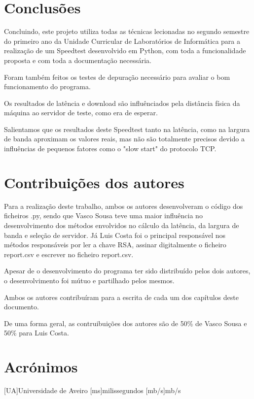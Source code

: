 \documentclass{report}
\begin{document}
\chapter{Conclusões}
\label{chap.conclusao}
\par Concluindo, este projeto utiliza todas as técnicas lecionadas no segundo semestre do primeiro ano da Unidade Curricular de Laboratórios de Informática para a realização de um Speedtest desenvolvido em Python\cite{python}, com toda a funcionalidade proposta e com toda a documentação necessária. 
\par Foram também feitos os testes de depuração necessário para avaliar o bom funcionamento do programa.
\par Os resultados de latência e download são influênciados pela distância física da máquina ao servidor de teste, como era de esperar.
\par Salientamos
que os resultados deste Speedtest tanto na latência, como na largura de banda aproximam os valores reais, mas não são totalmente precisos devido a influências de pequenos fatores como o "slow start" do protocolo TCP.

\chapter*{Contribuições dos autores}
\par Para a realização deste trabalho, ambos os autores desenvolveram o código dos ficheiros .py, sendo que Vasco Sousa teve uma maior influência no desenvolvimento dos métodos envolvidos no cálculo da latência, da largura de banda
e seleção de servidor. Já Luis Costa foi o principal responsável nos métodos responsáveis por ler a chave RSA, assinar digitalmente o ficheiro report.csv e escrever no ficheiro report.csv.
\par Apesar de o desenvolvimento do programa ter sido distribuído pelos dois autores, o desenvolvimento foi mútuo e partilhado pelos mesmos.
\par Ambos os autores contribuíram para a escrita de cada um dos capítulos deste documento.
\par De uma forma geral, as contruibuições dos autores são de 50\% de Vasco Sousa e 50\% para Luis Costa.


\chapter*{Acrónimos}
\begin{acronym}
[UA]{Universidade de Aveiro}
[ms]{milissegundos}
[mb/s]{mb/s}
\end{acronym}


\printbibliography
\end{document}
